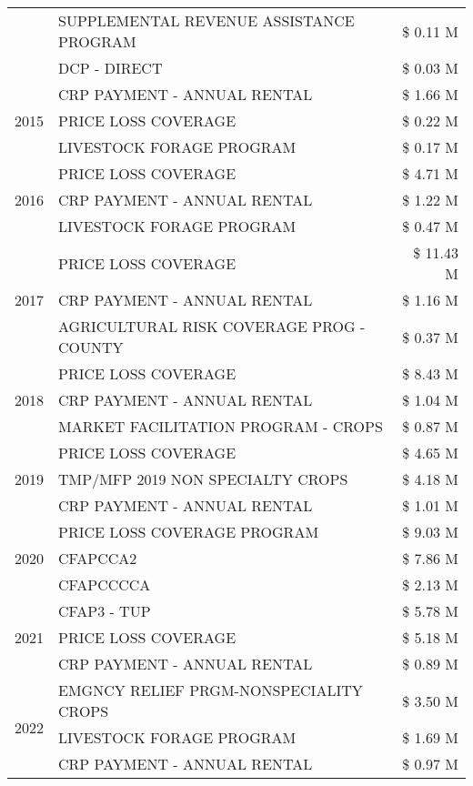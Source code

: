\begin{tabular}{llr}
 & SUPPLEMENTAL REVENUE ASSISTANCE PROGRAM & \$ 0.11 M \\
 & DCP - DIRECT & \$ 0.03 M \\
\cline{1-3}
\multirow[t]{3}{*}{2015} & CRP PAYMENT - ANNUAL RENTAL & \$ 1.66 M \\
 & PRICE LOSS COVERAGE & \$ 0.22 M \\
 & LIVESTOCK FORAGE PROGRAM & \$ 0.17 M \\
\cline{1-3}
\multirow[t]{3}{*}{2016} & PRICE LOSS COVERAGE & \$ 4.71 M \\
 & CRP PAYMENT - ANNUAL RENTAL & \$ 1.22 M \\
 & LIVESTOCK FORAGE PROGRAM & \$ 0.47 M \\
\cline{1-3}
\multirow[t]{3}{*}{2017} & PRICE LOSS COVERAGE & \$ 11.43 M \\
 & CRP PAYMENT - ANNUAL RENTAL & \$ 1.16 M \\
 & AGRICULTURAL RISK COVERAGE PROG - COUNTY & \$ 0.37 M \\
\cline{1-3}
\multirow[t]{3}{*}{2018} & PRICE LOSS COVERAGE & \$ 8.43 M \\
 & CRP PAYMENT - ANNUAL RENTAL & \$ 1.04 M \\
 & MARKET FACILITATION PROGRAM - CROPS & \$ 0.87 M \\
\cline{1-3}
\multirow[t]{3}{*}{2019} & PRICE LOSS COVERAGE & \$ 4.65 M \\
 & TMP/MFP 2019 NON SPECIALTY CROPS & \$ 4.18 M \\
 & CRP PAYMENT - ANNUAL RENTAL & \$ 1.01 M \\
\cline{1-3}
\multirow[t]{3}{*}{2020} & PRICE LOSS COVERAGE PROGRAM & \$ 9.03 M \\
 & CFAPCCA2 & \$ 7.86 M \\
 & CFAPCCCCA & \$ 2.13 M \\
\cline{1-3}
\multirow[t]{3}{*}{2021} & CFAP3 - TUP & \$ 5.78 M \\
 & PRICE LOSS COVERAGE & \$ 5.18 M \\
 & CRP PAYMENT - ANNUAL RENTAL & \$ 0.89 M \\
\cline{1-3}
\multirow[t]{3}{*}{2022} & EMGNCY RELIEF PRGM-NONSPECIALITY CROPS & \$ 3.50 M \\
 & LIVESTOCK FORAGE PROGRAM & \$ 1.69 M \\
 & CRP PAYMENT - ANNUAL RENTAL & \$ 0.97 M \\
\cline{1-3}
\bottomrule
\end{tabular}
